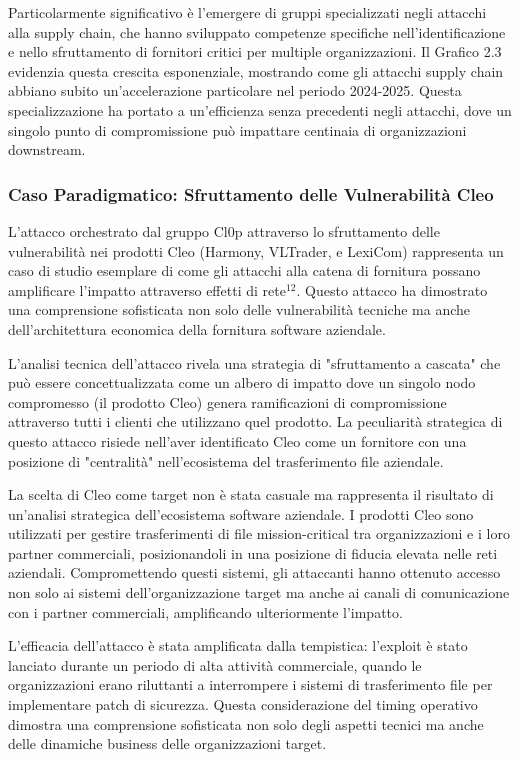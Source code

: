 {Particolarmente significativo è l'emergere di gruppi specializzati negli attacchi alla supply chain, che hanno sviluppato competenze specifiche nell'identificazione e nello sfruttamento di fornitori critici per multiple organizzazioni. Il Grafico 2.3 evidenzia questa crescita esponenziale, mostrando come gli attacchi supply chain abbiano subito un'accelerazione particolare nel periodo 2024-2025. Questa specializzazione ha portato a un'efficienza senza precedenti negli attacchi, dove un singolo punto di compromissione può impattare centinaia di organizzazioni downstream.

\subsubsection{Caso Paradigmatico: Sfruttamento delle Vulnerabilità Cleo}

L'attacco orchestrato dal gruppo Cl0p attraverso lo sfruttamento delle vulnerabilità nei prodotti Cleo (Harmony, VLTrader, e LexiCom) rappresenta un caso di studio esemplare di come gli attacchi alla catena di fornitura possano amplificare l'impatto attraverso effetti di rete$^{12}$. Questo attacco ha dimostrato una comprensione sofisticata non solo delle vulnerabilità tecniche ma anche dell'architettura economica della fornitura software aziendale.

L'analisi tecnica dell'attacco rivela una strategia di "sfruttamento a cascata" che può essere concettualizzata come un albero di impatto dove un singolo nodo compromesso (il prodotto Cleo) genera ramificazioni di compromissione attraverso tutti i clienti che utilizzano quel prodotto. La peculiarità strategica di questo attacco risiede nell'aver identificato Cleo come un fornitore con una posizione di "centralità" nell'ecosistema del trasferimento file aziendale.

La scelta di Cleo come target non è stata casuale ma rappresenta il risultato di un'analisi strategica dell'ecosistema software aziendale. I prodotti Cleo sono utilizzati per gestire trasferimenti di file mission-critical tra organizzazioni e i loro partner commerciali, posizionandoli in una posizione di fiducia elevata nelle reti aziendali. Compromettendo questi sistemi, gli attaccanti hanno ottenuto accesso non solo ai sistemi dell'organizzazione target ma anche ai canali di comunicazione con i partner commerciali, amplificando ulteriormente l'impatto.

L'efficacia dell'attacco è stata amplificata dalla tempistica: l'exploit è stato lanciato durante un periodo di alta attività commerciale, quando le organizzazioni erano riluttanti a interrompere i sistemi di trasferimento file per implementare patch di sicurezza. Questa considerazione del timing operativo dimostra una comprensione sofisticata non solo degli aspetti tecnici ma anche delle dinamiche business delle organizzazioni target.

}
